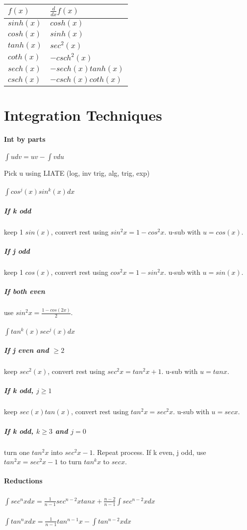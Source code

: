 \documentclass[10pt,landscape]{article}
\begin{document}
\begin{multicols}{4}
\begin{tabular}{l l}
$f(x)$ & $\frac{d}{dx}f(x)$ \\
\hline
$sinh(x)$ & $cosh(x)$ \\
$cosh(x)$ & $sinh(x)$ \\
$tanh(x)$ & $sec^2(x)$ \\
$coth(x)$ & $-csch^2(x)$ \\
$sech(x)$ & $-sech(x)tanh(x)$ \\
$csch(x)$ & $-csch(x)coth(x)$ \\
\hline
\end{tabular}

\section{Integration Techniques}

\paragraph{Int by parts} 
$\int u dv = uv - \int v du$

Pick u using LIATE (log, inv trig, alg, trig, exp)

\hrulefill

\paragraph{$ \int cos^j(x)sin^k(x)dx $}
\subparagraph{If k odd}
keep 1 $sin(x)$, convert rest using $sin^2x = 1-cos^2x$. u-sub with $u=cos(x)$.
\subparagraph{If j odd}
keep 1 $cos(x)$, convert rest using $cos^2x = 1-sin^2x$. u-sub with $u=sin(x)$.
\subparagraph{If both even}
use $sin^2x=\frac{1-cos(2x)}{2}$.

\paragraph{$ \int tan^k(x)sec^j(x)dx $}
\subparagraph{If j even and $\ge 2$}
keep $sec^2(x)$, convert rest using $sec^2x=tan^2x+1$. u-sub with $u=tanx$.
\subparagraph{If k odd, $j \ge 1$}
keep $sec(x)tan(x)$, convert rest using $tan^2x=sec^2x$. u-sub with $u=secx$.
\subparagraph{If k odd, $k \ge 3$ and $j=0$}
turn one $tan^2x$ into $sec^2x-1$. Repeat process.
If k even, j odd, use $tan^2x=sec^2x-1$ to turn $tan^kx$ to $secx$.

\paragraph{Reductions}
\subparagraph{}
$ \int sec^nx dx = \frac{1}{n-1}sec^{n-2}xtanx+\frac{n-2}{n-1}\int sec^{n-2}x dx$
\subparagraph{}
$ \int tan^nx dx = \frac{1}{n-1}tan^{n-1}x-\int tan^{n-2}x dx$


\end{multicols}
\end{document}
